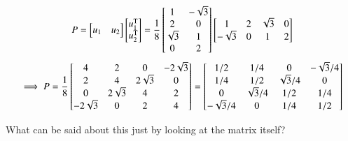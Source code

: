 \documentclass{article}      %
\newcommand{\T}[0]{\text{T}}
\begin{document}
\[
P =
\begin{bmatrix}
u_1 & u_2 \\
\end{bmatrix}
\begin{bmatrix}
u_1^\T \\
u_2^\T \\
\end{bmatrix}
=
\inv{8}
\begin{bmatrix}
1 & -\sqrt{3} \\
2 & 0 \\
\sqrt{3} & 1 \\
0 & 2 \\
\end{bmatrix}
\begin{bmatrix}
1 & 2 & \sqrt{3} & 0 \\
-\sqrt{3} & 0 & 1 & 2 \\
\end{bmatrix}
\]
\[
\implies
P =
\frac{1}{8}
\begin{bmatrix}
4 & 2 & 0 & -2\sqrt{3} \\
2 & 4 & 2\sqrt{3} & 0 \\
0 & 2\sqrt{3} & 4 & 2 \\
-2\sqrt{3} & 0 & 2 & 4 \\
\end{bmatrix}
=
\begin{bmatrix}
1/2 & 1/4 & 0 & -\sqrt{3}/4 \\
1/4 & 1/2 & \sqrt{3}/4 & 0 \\
0 & \sqrt{3}/4 & 1/2 & 1/4 \\
-\sqrt{3}/4 & 0 & 1/4 & 1/2 \\
\end{bmatrix}
\]

What can be said about this just by looking at the matrix itself?
\end{document}
